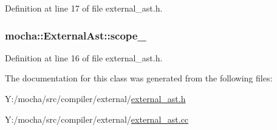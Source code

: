 Definition at line 17 of file external\_\-ast.h.

\hypertarget{classmocha_1_1_external_ast_a8ba3452784b6fe06fc0f9611c1b15fe8}{
\subsubsection[{scope\_\-}]{ {\bf mocha::ExternalAst::scope\_\-}}}
\label{classmocha_1_1_external_ast_a8ba3452784b6fe06fc0f9611c1b15fe8}


Definition at line 16 of file external\_\-ast.h.



The documentation for this class was generated from the following files:\begin{DoxyCompactItemize}
\item 
Y:/mocha/src/compiler/external/\hyperlink{external__ast_8h}{external\_\-ast.h}\item 
Y:/mocha/src/compiler/external/\hyperlink{external__ast_8cc}{external\_\-ast.cc}\end{DoxyCompactItemize}
